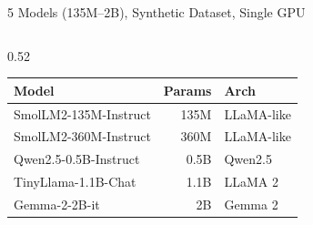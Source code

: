 \documentclass[10pt, aspectratio=169]{beamer}
\begin{document}
\begin{frame}{5 Models (135M–2B), Synthetic Dataset, Single GPU}
  \begin{columns}[T]
    \begin{column}{0.52\textwidth}
      \begin{tcolorbox}[tablecard]
      \renewcommand{\arraystretch}{1.3}
      \centering
      \scriptsize
      \begin{tabular}{@{}lrl@{}}
        \rowcolor{cardbg}
        \textbf{Model}         & \textbf{Params} & \textbf{Arch} \\
        \midrule
        SmolLM2-135M-Instruct  & 135M & LLaMA-like \\
        SmolLM2-360M-Instruct  & 360M & LLaMA-like \\
        Qwen2.5-0.5B-Instruct  & 0.5B & Qwen2.5 \\
        TinyLlama-1.1B-Chat    & 1.1B & LLaMA 2 \\
        Gemma-2-2B-it          &   2B & Gemma 2 \\
      \end{tabular}
      \end{tcolorbox}
      \vspace{0.2em}


\end{column}
\end{columns}
\end{frame}
\end{document}
